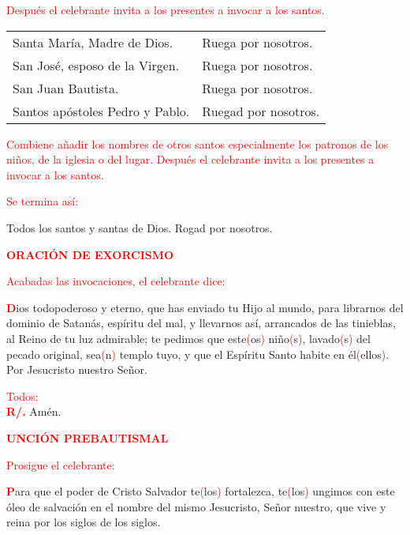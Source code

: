\documentclass[12pt, letterpaper, spanish]{article}
\begin{document}
  \large {\textcolor{red}{Despu\'es el celebrante invita a los presentes a invocar a los santos.}} 

  \noindent
  \Large \begin{tabular}{ll}
  Santa Mar\'ia, Madre de Dios.& Ruega por nosotros. \\
  San Jos\'e, esposo de la Virgen.& Ruega por nosotros. \\
  San Juan Bautista.& Ruega por nosotros. \\
  Santos ap\'ostoles Pedro y Pablo.& Ruegad por nosotros.
  \end{tabular}

  \large {\textcolor{red}{Combiene a\~nadir los nombres de otros santos especialmente los patronos de los ni\~nos, de la iglesia o del lugar. Despu\'es el celebrante invita a los presentes a invocar a los santos.}} 

  \large {\textcolor{red}{Se termina as\'i:}} 

  \noindent
  \Large Todos los santos y santas de Dios. Rogad por nosotros. 

  \Large {\bfseries \textcolor{red}{ORACI\'ON DE EXORCISMO}} 

  \large {\textcolor{red}{Acabadas las invocaciones, el celebrante dice:}} 

  \lettrine[lines=2]{\bfseries \textcolor{red}{D}}{}\Large ios todopoderoso y eterno, que has enviado tu Hijo al mundo, para librarnos del dominio de Satan\'as, esp\'iritu del mal, y llevarnos as\'i, arrancados de las tinieblas, al Reino de tu luz admirable; te pedimos que este\textcolor{red}{(}os\textcolor{red}{)} ni\~no\textcolor{red}{(}s\textcolor{red}{)}, lavado\textcolor{red}{(}s\textcolor{red}{)} del pecado original, sea\textcolor{red}{(}n\textcolor{red}{)} templo tuyo, y que el Esp\'iritu Santo habite en \'el\textcolor{red}{(}ellos\textcolor{red}{)}. Por Jesucristo nuestro Se\~nor.

  \large {\textcolor{red}{Todos:}}\\
  \Large {\bfseries \textcolor{red}{R/.}} \hspace{0.5cm} Am\'en.

  \clearpage

  \Large {\bfseries \textcolor{red}{UNCI\'ON PREBAUTISMAL}} 

  \large {\textcolor{red}{Prosigue el celebrante:}}
  
  \lettrine[lines=2]{\bfseries \textcolor{red}{P}}{}\Large ara que el poder de Cristo Salvador te\textcolor{red}{(}los\textcolor{red}{)} fortalezca, te\textcolor{red}{(}los\textcolor{red}{)} ungimos con este \'oleo de salvaci\'on en el nombre del mismo Jesucristo, Se\~nor nuestro, que vive y reina por los siglos de los siglos.
\end{document}
